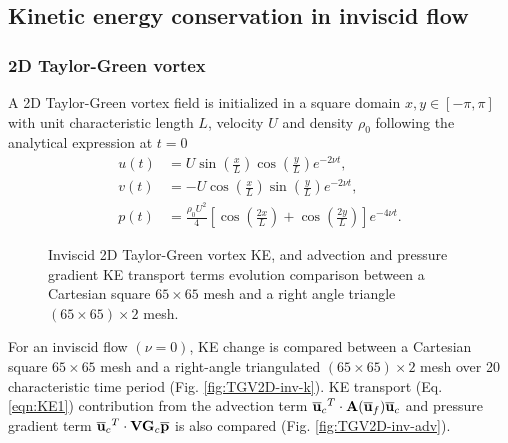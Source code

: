 \subsection{Kinetic energy conservation in inviscid flow}
\label{sec:inviscidKE}

\subsubsection{2D Taylor-Green vortex}
\label{sec:TGV2d-inv}
A 2D Taylor-Green vortex field is initialized in a square domain $x, y \in [-\pi, \pi]$ with unit characteristic length $L$, velocity $U$ and density $\rho_0$ following the analytical expression at $t=0$
\begin{equation}
\begin{split}
u(t) &=U \sin \left(\frac{x}{L}\right) \cos \left(\frac{y}{L}\right) e^{-2\nu t},
\\
v(t) &=-U \cos \left(\frac{x}{L}\right) \sin \left(\frac{y}{L}\right) e^{-2\nu t},
\\
p(t) &=\frac{\rho_{0} U^{2}}{4}\left[\cos \left(\frac{2 x}{L}\right)+\cos \left(\frac{2 y}{L}\right)\right] e^{-4\nu t}.
\end{split}
\end{equation}


\begin{figure}[!h]
\centering
{}
\caption{Inviscid 2D Taylor-Green vortex KE, and advection and pressure gradient KE transport terms evolution comparison between a Cartesian square $65 \times 65$ mesh and a right angle triangle $(65 \times 65)\times 2$ mesh.} 
\label{fig:TGV2D-inv}
\end{figure}

For an inviscid flow $(\nu = 0)$, KE change is compared between a Cartesian square $65 \times 65$ mesh and a right-angle triangulated $(65 \times 65)\times 2$ mesh over 20 characteristic time period (Fig. \ref{fig:TGV2D-inv-k}). KE transport (Eq. \ref{eqn:KE1}) contribution from the advection term ${\overline{\mathbf{u}}_c}^T \cdot \mathbf{A}(\overline{\mathbf{u}}_f) {\overline{\mathbf{u}}_c} $ and pressure gradient term ${\overline{\mathbf{u}}_c}^T \cdot \mathbf{V}\mathbf{G}_c \overline{\mathbf{p}}$ is also compared (Fig. \ref{fig:TGV2D-inv-adv}).

